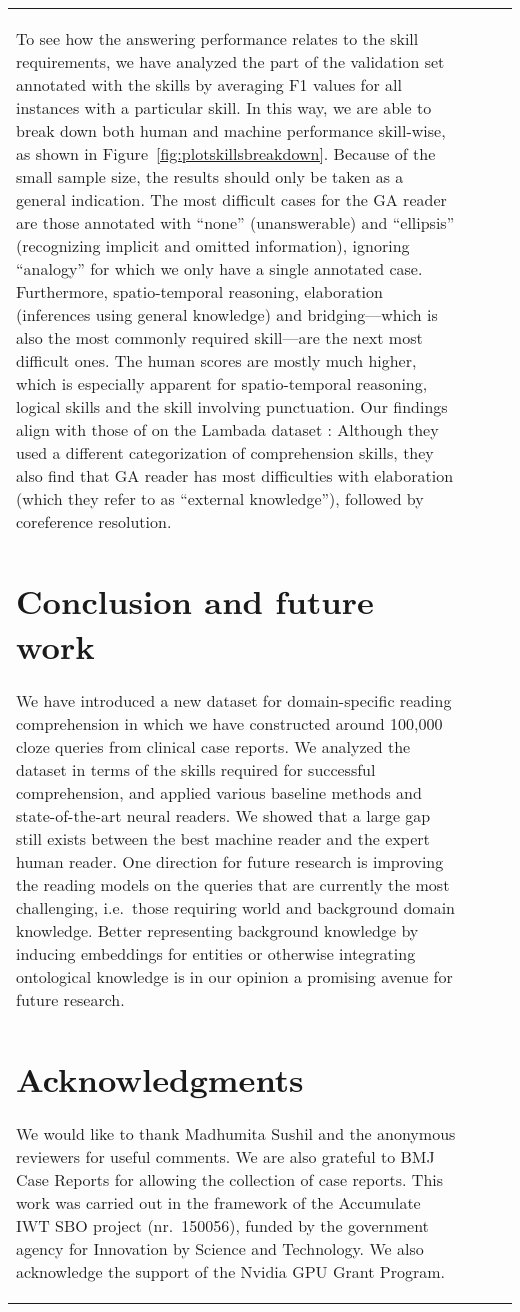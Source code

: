 \documentclass[11pt,a4paper]{article}
\begin{document}
\begin{table}[t]
\begin{tabular}{p{2.7cm} p{1.8cm} l r}
{To see how the answering performance relates to the skill requirements, we have analyzed the part of the validation set annotated with the skills by averaging F1 values for all instances with a particular skill. In this way, we are able to break down both human and machine performance skill-wise, as shown in Figure~\ref{fig:plotskillsbreakdown}. Because of the small sample size, the results should only be taken as a general indication. The most difficult cases for the GA reader are those annotated with \enquote{none} (unanswerable) and \enquote{ellipsis} (recognizing implicit and omitted information), ignoring \enquote{analogy} for which we only have a single annotated case. Furthermore, spatio-temporal reasoning, elaboration (inferences using general knowledge) and bridging---which is also the most commonly required skill---are the next most difficult ones. The human scores are mostly much higher, which is especially apparent for spatio-temporal reasoning, logical skills and the skill involving punctuation. 
Our findings align with those of \citet{ChuEtAl2017} on the Lambada dataset \citep{PapernoEtAl2016}: Although they used a different categorization of comprehension skills, they also find that GA reader has most difficulties with elaboration (which they refer to as \enquote{external knowledge}), followed by coreference resolution.

\section{Conclusion and future work}
We have introduced a new dataset for domain-specific reading comprehension in which we have constructed around 100,000 cloze queries from clinical case reports. We analyzed the dataset in terms of the skills required for successful comprehension, and applied various baseline methods and state-of-the-art neural readers. We showed that a large gap still exists between the best machine reader and the expert human reader. One direction for future research is improving the reading models on the queries that are currently the most challenging, i.e.\ those requiring world and background domain knowledge. Better representing background knowledge by inducing embeddings for entities or otherwise integrating ontological knowledge is in our opinion a promising avenue for future research.


\section*{Acknowledgments}
We would like to thank Madhumita Sushil and the anonymous reviewers for useful comments. We are also grateful to BMJ Case Reports for allowing the collection of case reports. This work was carried out in the framework of the Accumulate IWT SBO project (nr.\ 150056), funded by the government agency for Innovation by Science and Technology. We also acknowledge the support of the Nvidia GPU Grant Program.

}
\end{tabular}
\end{table}
\end{document}
